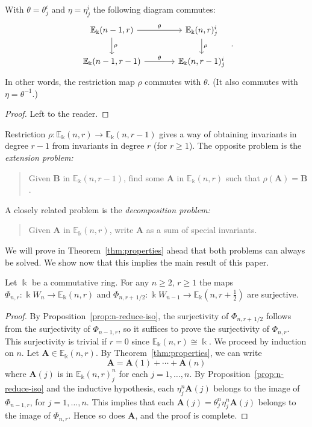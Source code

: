 \documentclass[ALCO,ThmDefs,Unicode,epreuves]{cedram}
\newcommand{\E}{\mathbb{E}}
\newcommand{\bA}{\mathbf{A}}
\newcommand{\bB}{\mathbf{B}}
\newcommand{\half}{\, 1/2} %
\newcommand{\fhalf}{\frac{1}{2}} %
\begin{document}
\begin{lemm}\label{lem:theta-rho-commute}
 With $\theta = \theta^i_j$ and $\eta = \eta^i_j$ the
 following diagram commutes:
 \[
 \begin{tikzcd}[column sep = large]
 \E_\Bbbk(n-1,r) \arrow{r}{\theta} \arrow{d}{\rho}
 & \E_\Bbbk(n,r)^i_j \arrow{d}{\rho}\\
 \E_\Bbbk(n-1,r-1) \arrow{r}{\theta}& \E_\Bbbk(n,r-1)^i_j 
 \end{tikzcd} \; .
 \]
 In other words, the restriction map $\rho$ commutes with $\theta$.
 \textup{(}It also commutes with $\eta = \theta^{-1}$.\textup{)}
\end{lemm}


\begin{proof}
Left to the reader.
\end{proof}


Restriction $\rho: \E_\Bbbk(n,r) \to \E_\Bbbk(n,r-1)$ gives a way of
obtaining invariants in degree $r-1$ from invariants in degree $r$
(for $r\ge 1$). The opposite problem is the \emph{extension problem:}
\begin{quote}
 Given $\bB$ in $\E_\Bbbk(n,r-1)$, find some $\bA$ in $\E_\Bbbk(n,r)$
 such that $\rho(\bA) = \bB$.
\end{quote}
A closely related problem is the \emph{decomposition problem:}
\begin{quote}
 Given $\bA$ in $\E_\Bbbk(n,r)$, write $\bA$ as a sum of special
 invariants.
\end{quote}
We will prove in Theorem~\ref{thm:properties} ahead that both problems
can always be solved. We show now that this implies the main result of
this paper.



\begin{theo}\label{thm:main1}
 Let $\Bbbk$ be a commutative ring. For any $n \ge 2$, $r \ge
 1$ the maps $\Phi_{n,r}: \Bbbk W_n \to \E_\Bbbk(n,r)$ and
 $\Phi_{n,r+\half}: \Bbbk W_{n-1} \to \E_\Bbbk(n,r+\fhalf)$ are
 surjective.
\end{theo}


\begin{proof}
By Proposition~\ref{prop:n-reduce-iso}, the surjectivity of
$\Phi_{n,r+\half}$ follows from the surjectivity of $\Phi_{n-1,r}$, so
it suffices to prove the surjectivity of $\Phi_{n,r}$. This
surjectivity is trivial if $r=0$ since $\E_\Bbbk(n,r) \cong \Bbbk$. We
proceed by induction on $n$. Let $\bA \in \E_\Bbbk(n,r)$. By Theorem~\ref{thm:properties}, we can write
\[
\bA = \bA(1) + \cdots + \bA(n)
\]
where $\bA(j)$ is in $\E_\Bbbk(n,r)^n_j$ for each $j = 1, \dots,
n$. By Proposition~\ref{prop:n-reduce-iso} and the inductive
hypothesis, each $\eta^n_j \bA(j)$ belongs to the image of
$\Phi_{n-1,r}$, for $j = 1, \dots, n$. This implies that each $\bA(j)
= \theta^n_j \eta^n_j \bA(j)$ belongs to the image of
$\Phi_{n,r}$. Hence so does $\bA$, and the proof is complete.
\end{proof}
\end{document}
